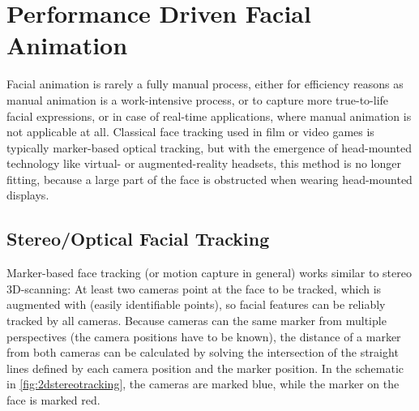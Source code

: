 \chapter{Performance Driven Facial Animation}
\label{chap:performancedrivenfacialanimation}

Facial animation is rarely a fully manual process,
either for efficiency reasons as manual animation is a work-intensive process,
or to capture more true-to-life facial expressions,
or in case of real-time applications,
where manual animation is not applicable at all.
Classical face tracking used in film or video games is typically marker-based optical tracking,
but with the emergence of head-mounted technology like virtual- or augmented-reality headsets,
this method is no longer fitting,
because a large part of the face is obstructed when wearing head-mounted displays.

\section{Stereo/Optical Facial Tracking}
\label{sec:facialtracking}

Marker-based face tracking (or motion capture in general) works similar to stereo 3D-scanning:
At least two cameras point at the face to be tracked,
which is augmented with  (easily identifiable points),
so facial features can be reliably tracked by all cameras.
Because cameras can  the same marker from multiple perspectives (the camera positions have to be known),
the distance of a marker from both cameras can be calculated by solving the intersection of the straight lines defined by each camera position and the marker position.
In the schematic in \autoref{fig:2dstereotracking}, the cameras are marked blue, while the marker on the face is marked red.

